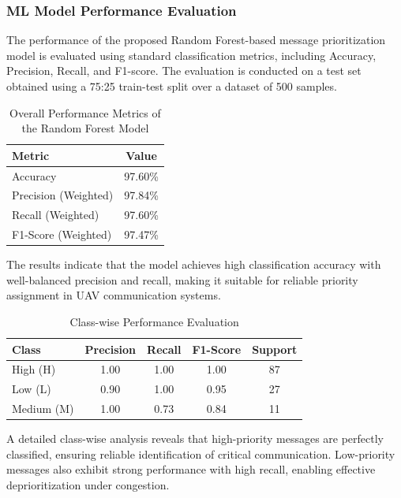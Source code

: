 \documentclass[pdflatex,sn-mathphys-num]{sn-jnl}%
\theoremstyle{thmstyleone}%
\theoremstyle{thmstyletwo}%
\theoremstyle{thmstylethree}%
\begin{document}
\subsubsection{ML Model Performance Evaluation}

The performance of the proposed Random Forest-based message prioritization model is evaluated using standard classification metrics, including Accuracy, Precision, Recall, and F1-score. The evaluation is conducted on a test set obtained using a 75:25 train-test split over a dataset of 500 samples.

\begin{table}[h]
\centering
\caption{Overall Performance Metrics of the Random Forest Model}
\label{tab:overall_ml_performance}
\begin{tabular}{|l|c|}
\hline
\textbf{Metric} & \textbf{Value} \\
\hline
Accuracy & 97.60\% \\
Precision (Weighted) & 97.84\% \\
Recall (Weighted) & 97.60\% \\
F1-Score (Weighted) & 97.47\% \\
\hline
\end{tabular}
\end{table}

The results indicate that the model achieves high classification accuracy with well-balanced precision and recall, making it suitable for reliable priority assignment in UAV communication systems.

\begin{table}[h]
\centering
\caption{Class-wise Performance Evaluation}
\label{tab:classwise_performance}
\begin{tabular}{|l|c|c|c|c|}
\hline
\textbf{Class} & \textbf{Precision} & \textbf{Recall} & \textbf{F1-Score} & \textbf{Support} \\
\hline
High (H) & 1.00 & 1.00 & 1.00 & 87 \\
Low (L) & 0.90 & 1.00 & 0.95 & 27 \\
Medium (M) & 1.00 & 0.73 & 0.84 & 11 \\
\hline
\end{tabular}
\end{table}

A detailed class-wise analysis reveals that high-priority messages are perfectly classified, ensuring reliable identification of critical communication. Low-priority messages also exhibit strong performance with high recall, enabling effective deprioritization under congestion.
\end{document}
